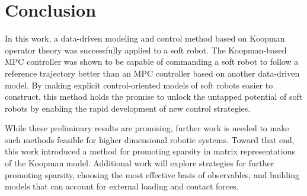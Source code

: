 \section{Conclusion}
\label{sec:conclusion}

In this work, a data-driven modeling and control method based on Koopman operator theory was successfully applied to a soft robot.
The Koopman-based MPC controller was shown to be capable of commanding a soft robot to follow a reference trajectory better than an MPC controller based on another data-driven model.
By making explicit control-oriented models of soft robots easier to construct, this method holds the promise to unlock the untapped potential of soft robots by enabling the rapid development of new control strategies.

While these preliminary results are promising, further work is needed to make such methods feasible for higher dimensional robotic systems.
Toward that end, this work introduced a method for promoting sparsity in matrix representations of the Koopman model.
Additional work will explore strategies for further promoting sparsity, choosing the most effective basis of observables, and building models that can account for external loading and contact forces.








